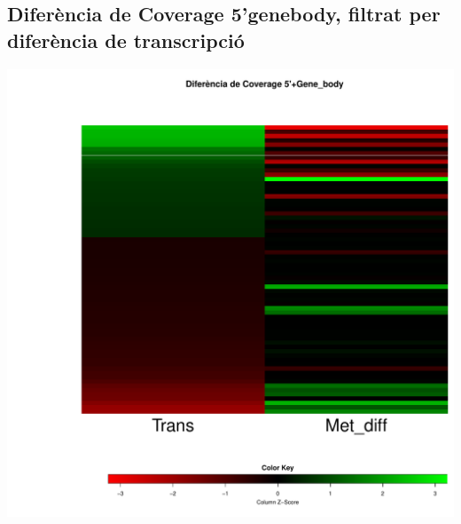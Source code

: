 \documentclass{article}\usepackage[]{graphicx}\usepackage[]{color}
\newenvironment{knitrout}{}{} %
\begin{document}
\subsection{Diferència de Coverage 5'genebody, filtrat per diferència de transcripció}
\begin{knitrout}
\color{fgcolor}

{\centering \includegraphics[width=.9\linewidth]{figure/minimal-_heat_cov_diff_body5-1} 

}



\end{knitrout}
\clearpage
\end{document}

